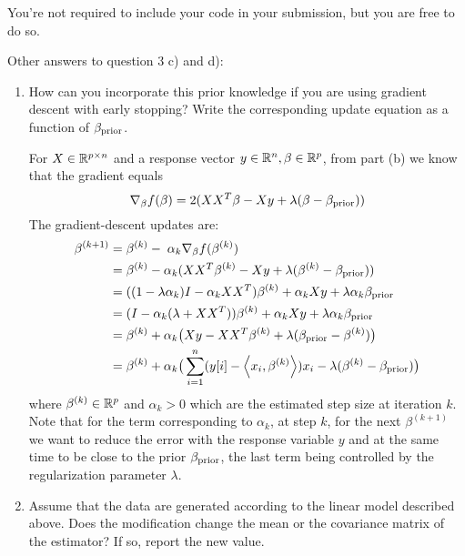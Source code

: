 \documentclass[12pt,twoside]{article}
\begin{document}
\begin{enumerate}
\begin{enumerate}
  \end{enumerate}
You're not required to include your code in your submission, but you are free to do so. 
 \end{enumerate}
 
 \newpage
 
 Other answers to question 3 c) and d):
 \begin{enumerate}
 
     \item How can you incorporate this prior knowledge if you are using gradient descent with early stopping? Write the corresponding update equation as a function of $\beta_{\operatorname{prior}}$.\\

\medskip				

For $X  \in \mathbb{R}^{p \times n}$ and a response vector $y \in \mathbb{R}^n, \beta \in \mathbb{R}^p$, from part (b) we know that the gradient equals $$\nabla_{\beta} f(\beta) =	2 (X X^T \beta - X y +  \lambda (\beta - \beta_{\operatorname{prior}}))$$
The gradient-descent updates are:
\begin{align*}
		\beta^{(k+1)}	&=	\beta^{(k)} - \; \alpha_k \nabla_{\beta} f(\beta^{(k)})	\\
					&=	\beta^{(k)}  - \alpha_k (X X^T \beta^{(k)} - X y +  \lambda (\beta^{(k)} - \beta_{\operatorname{prior}})) \\
					&=    ((1- \lambda \alpha_k) I  - \alpha_k X X^T) \beta^{(k)}  +  \alpha_k  X y  + \lambda  \alpha_k  \beta_{\operatorname{prior}} \\
					&=	(I -  \alpha_k (\lambda +  X X^T)) \beta^{(k)}  +  \alpha_k  X y  + \lambda  \alpha_k  \beta_{\operatorname{prior}} \\
					&=	\beta^{(k)}  + \alpha_k  \big( X y  - X X^T \beta^{(k)}   + \lambda (\beta_{\operatorname{prior}} - \beta^{(k)}) \big) \\
					&=	 \beta^{(k)}  +  \alpha_k  \big( \sum_{i=1}^n (y[i] - \left \langle x_i, \beta^{(k)}\right \rangle) x_i - \lambda ( \beta^{(k)}  -   \beta_{\operatorname{prior}}) \big)
\end{align*}
   where $\beta^{(k)} \in \mathbb{R}^p$ and $ \alpha_k > 0$ which are the estimated step size at iteration $k$. Note that for the term corresponding to $\alpha_k$, at  step $k$, for the next $\beta^{(k+1)}$ 
   we want to reduce the error with the response variable $y$  and at the same time to be close to the prior $\beta_{\operatorname{prior}}$, the last term being controlled by the regularization parameter $\lambda$.
   
    \item Assume that the data are generated according to the linear model described above. Does the modification change the mean or the covariance matrix of the estimator? If so, report the new value.\\
    

\end{enumerate}
\end{document}
